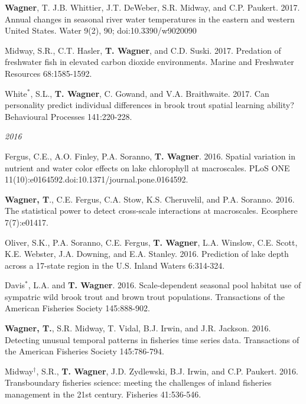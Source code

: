 \documentclass[10pt]{article}
\begin{document}
\begin{flushleft}
\begin{etaremune}[start=70]
\item {\bf Wagner}, T. J.B. Whittier, J.T. DeWeber, S.R. Midway, and C.P. Paukert. 2017. Annual changes in seasonal river water temperatures in the eastern and western United States. Water 9(2), 90; doi:10.3390/w9020090

\item Midway, S.R., C.T. Hasler, {\bf T. Wagner}, and C.D. Suski. 2017. Predation of freshwater fish in elevated carbon dioxide environments. Marine and Freshwater Resources 68:1585-1592.

\item White$^*$, S.L., {\bf T. Wagner}, C. Gowand, and V.A. Braithwaite. 2017. Can personality predict individual differences in brook trout spatial learning ability? Behavioural Processes 141:220-228. 

\end{etaremune}
\emph{2016}
\begin{etaremune}[start=55]

\item Fergus, C.E., A.O. Finley, P.A. Soranno, {\bf T. Wagner}. 2016. Spatial variation in nutrient and water color effects on lake chlorophyll at macroscales. PLoS ONE 11(10):e0164592.doi:10.1371/journal.pone.0164592.

\item {\bf Wagner, T}., C.E. Fergus, C.A. Stow, K.S. Cheruvelil, and P.A. Soranno. 2016. The statistical power to detect cross-scale interactions at macroscales. Ecosphere 7(7):e01417.

\item Oliver, S.K., P.A. Soranno, C.E. Fergus, {\bf T. Wagner}, L.A. Winslow, C.E. Scott, K.E. Webster, J.A. Downing, and E.A. Stanley. 2016. Prediction of lake depth across a 17-state region in the U.S. Inland Waters 6:314-324.

\item Davis$^*$, L.A. and {\bf T. Wagner}. 2016. Scale-dependent seasonal pool habitat use of sympatric wild brook trout and brown trout populations. Transactions of the American Fisheries Society 145:888-902.

\item {\bf Wagner, T.}, S.R. Midway, T. Vidal, B.J. Irwin, and J.R. Jackson. 2016. Detecting unusual temporal patterns in fisheries time series data. Transactions of the American Fisheries Society 145:786-794.

\item Midway$^\dagger$, S.R., {\bf T. Wagner}, J.D. Zydlewski, B.J. Irwin, and C.P. Paukert. 2016. Transboundary fisheries science: meeting the challenges of inland fisheries management in the 21st century. Fisheries 41:536-546.


\end{etaremune}
\end{flushleft}
\end{document}
